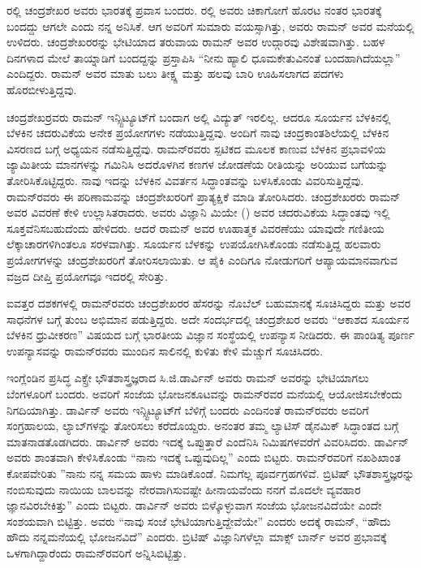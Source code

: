 ರಲ್ಲಿ ಚಂದ್ರಶೇಖರ ಅವರು ಭಾರತಕ್ಕೆ ಪ್ರವಾಸ ಬಂದರು. ರಲ್ಲಿ ಅವರು ಚಿಕಾಗೋಗೆ ಹೊರಟ ನಂತರ ಭಾರತಕ್ಕೆ ಬಂದದ್ದು ಆಗಲೇ ಎಂದು ನನ್ನ ಅನಿಸಿಕೆ. ಆಗ ಅವರಿಗೆ ಸುಮಾರು  ವಯಸ್ಸಾಗಿತ್ತು, ಅವರು ರಾಮನ್ ಅವರ ಮನೆಯಲ್ಲಿ ಉಳಿದರು. ಚಂದ್ರಶೇಖರರನ್ನು ಭೇಟಿಯಾದ ತರುವಾಯ ರಾಮನ್ ಅವರ ಉದ್ಗಾರವು ವಿಶೇಷವಾಗಿತ್ತು. ಬಹಳ ದಿನಗಳಾದ ಮೇಲೆ ತಾಯ್ನಾಡಿಗೆ ಬಂದದ್ದನ್ನು ಪ್ರಸ್ತಾಪಿಸಿ “ನೀನು ಹ್ಯಾಲಿ ಧೂಮಕೇತುವಿನಂತೆ ಬಂದಹಾಗಿದೆಯಲ್ಲಾ” ಎಂದಿದ್ದರು. ರಾಮನ್ ಅವರ ಮಾತು ಬಲು ತೀಕ್ಷ್ಣ ಮತ್ತು ಹಲವು ಬಾರಿ ಊಹಿಸಲಾಗದ ಪದಗಳು ಹೊರಬೀಳುತ್ತಿದ್ದವು.

\newpage

ಚಂದ್ರಶೇಖರ್‍ರವರು ರಾಮನ್ ಇನ್ಸ್ಟಿಟ್ಯೂಟ್‍ಗೆ ಬಂದಾಗ ಅಲ್ಲಿ ವಿದ್ಯುತ್ ಇರಲಿಲ್ಲ. ಆದರೂ ಸೂರ್ಯನ ಬೆಳಕಿನಲ್ಲಿ ಬೆಳಕಿನ ಚದರುವಿಕೆಯ ಅನೇಕ ಪ್ರಯೋಗಗಳು ನಡೆಯುತ್ತಿದ್ದವು. ಅಂದಿಗೆ ನಾವು ಚಂದ್ರಕಾಂತಶಿಲೆಯಲ್ಲಿ ಬೆಳಕಿನ ವಿಸರಣದ ಬಗ್ಗೆ ಅಧ್ಯಯನ ನಡೆಸುತ್ತಿದ್ದೆವು. ರಾಮನ್‍ರವರು ಸ್ಪಟಿಕದ ಮೂಲಕ ಕಾಣುವ ಬೆಳಕಿನ ಪ್ರಭಾವಳಿಯ ಜ್ಯಾಮಿತೀಯ ಮಾನಗಳನ್ನು ಗಮಿನಿಸಿ ಅದರೊಳಗಿನ ಕಣಗಳ ಜೋಡಣೆಯ ರೀತಿಯನ್ನು ಅರಿಯುವ ಬಗೆಯನ್ನು ತೋರಿಸಿಕೊಟ್ಟಿದ್ದರು. ನಾವು ಇದನ್ನು ಬೆಳಕಿನ ವಿವರ್ತನ ಸಿದ್ಧಾಂತವನ್ನು ಬಳಸಿಕೊಂಡು ವಿವರಿಸುತ್ತಿದ್ದೆವು. ರಾಮನ್‍ರವರು ಈ ಪರಿಣಾಮವನ್ನು ಚಂದ್ರಶೇಖರರಿಗೆ ಪ್ರಾತ್ಯಕ್ಷಿಕೆ ಮಾಡಿ ತೋರಿಸಿದರು. ಚಂದ್ರಶೇಖರರು ರಾಮನ್ ಅವರ ವಿವರಣೆ ಕೇಳಿ ಉಲ್ಲಾಸಿತರಾದರು. ಅವರು ವಿಜ್ಞಾನಿ ಮಿಯೇ () ಅವರ ಚದರುವಿಕೆಯ ಸಿದ್ಧಾಂತವು ಇಲ್ಲಿ ಸೂಕ್ತವೆನಿಸಬಹುದೆಂದು ಹೇಳಿದರು. ಆದರೆ ರಾಮನ್ ಅವರ ಊಹಾತ್ಮಕ ವಿವರಣೆಯು ಯಾವುದೇ ಗಣಿತೀಯ ಲೆಕ್ಕಾಚಾರಗಳಿಗಿಂತಲೂ ಸರಳವಾಗಿತ್ತು. ಸೂರ್ಯನ ಬೆಳಕನ್ನು ಉಪಯೋಗಿಸಿಕೊಂಡು ನಡೆಸುತ್ತಿದ್ದ ಹಲವಾರು ಪ್ರಯೋಗಗಳನ್ನು ಚಂದ್ರಶೇಖರರಿಗೆ ತೋರಿಸಲಾಯಿತು. ಆ ಪೈಕಿ ಎಂದಿಗೂ ನೋಡುಗರಿಗೆ ಆಪ್ಯಾಯಮಾನವಾಗುವ ವಜ್ರದ ದೀಪ್ತಿ ಪ್ರಯೋಗವೂ ಇದರಲ್ಲಿ ಸೇರಿತ್ತು.

ಐವತ್ತರ ದಶಕಗಳಲ್ಲಿ ರಾಮನ್‍ರವರು ಚಂದ್ರಶೇಖರರ ಹೆಸರನ್ನು ನೊಬೆಲ್ ಬಹುಮಾನಕ್ಕೆ ಸೂಚಿಸಿದ್ದರು ಮತ್ತು ಅವರ ಸಾಧನೆಗಳ ಬಗ್ಗೆ ತುಂಬ ಅಭಿಮಾನ ಪಡುತ್ತಿದ್ದರು. ಅದೇ ಸಂದರ್ಭದಲ್ಲಿ ಚಂದ್ರಶೇಖರ ಅವರು “ಆಕಾಶದ ಸೂರ್ಯನ ಬೆಳಕಿನ ಧ್ರುವೀಕರಣ” ವಿಷಯದ ಬಗ್ಗೆ ಭಾರತೀಯ ವಿಜ್ಞಾನ ಸಂಸ್ಥೆಯಲ್ಲಿ ಉಪನ್ಯಾಸ ನೀಡಿದರು. ಈ ಪಾಂಡಿತ್ಯ ಪೂರ್ಣ ಉಪನ್ಯಾಸವನ್ನು ರಾಮನ್‍ರವರು ಮುಂದಿನ ಸಾಲಿನಲ್ಲಿ ಕುಳಿತು ಕೇಳಿ ಮೆಚ್ಚುಗೆ ಸೂಚಿಸಿದರು.

\vskip 2pt



ಇಂಗ್ಲೆಂಡಿನ ಪ್ರಸಿದ್ಧ ಎಕ್ಸ್\enginline{-}ರೇ ಭೌತಶಾಸ್ತ್ರಜ್ಞರಾದ ಸಿ.ಜಿ.ಡಾರ್ವಿನ್ ಅವರು ರಾಮನ್ ಅವರನ್ನು ಭೇಟಿಯಾಗಲು ಬೆಂಗಳೂರಿಗೆ ಬಂದರು. ಅವರಿಗೆ ಸಂಜೆಯ ಭೋಜನಕೂಟವನ್ನು ರಾಮನ್‍ರವರ ಮನೆಯಲ್ಲಿ ಆಯೋಜಿಸಬೇಕೆಂದು ನಿಗದಿಯಾಗಿತ್ತು. ಡಾರ್ವಿನ್ ಅವರು ಇನ್ಸ್ಟಿಟ್ಯೂಟ್‍ಗೆ ಬೆಳಿಗ್ಗೆ ಬಂದರು ಎಂದಿನಂತೆ ರಾಮನ್‍ರವರು ಅವರಿಗೆ ಸಂಗ್ರಹಾಲಯ, ಲ್ಯಾಬ್‍ಗಳನ್ನು ತೋರಿಸಲು ಕರೆದೊಯ್ದರು. ಅನಂತರ ತಮ್ಮ ಲ್ಯಾಟಿಸ್ ಡೈನಮಿಕ್ ಸಿದ್ಧಾಂತದ ಬಗ್ಗೆ ಮಾತನಾಡತೊಡಗಿದರು. ಡಾರ್ವಿನ್ ಅವರು ಇದಕ್ಕೆ ಒಪ್ಪುತ್ತಾರೆ ಎಂದೆನಿಸಿ  ನಿಮಿಷಗಳವರೆಗೆ ವಿವರಿಸಿದರು. ಡಾರ್ವಿನ್ ಅವರು ಶಾಂತವಾಗಿ ಕೇಳಿಸಿಕೊಂಡು “ನಾನು ಇದಕ್ಕೆ ಒಪ್ಪುವುದಿಲ್ಲ” ಎಂದು ಬಿಟ್ಟರು. ರಾಮನ್‍ರವರಿಗೆ ನಖಶಿಖಾಂತ ಕೋಪವೇರಿತು ”ನಾನು ನನ್ನ ಸಮಯ ಹಾಳು ಮಾಡಿಕೊಂಡೆ. ನಿಮಗೆಲ್ಲ ಪೂರ್ವಗ್ರಹಗಳಿವೆ. ಬ್ರಿಟಿಷ್ ಭೌತಶಾಸ್ತ್ರಜ್ಞರನ್ನು ನಂಬಿಸುವುದು ನಾಯಿಯ ಬಾಲವನ್ನು ನೇರವಾಗಿಸುವಷ್ಟೇ ಹೀನಾಯವೆಂದು ನನಗೆ ಮೊದಲೇ ವ್ಯವಹಾರ ಜ್ಞಾನವಿರಬೇಕಿತ್ತು” ಎಂದು ಬಿಟ್ಟರು. ಡಾರ್ವಿನ್ ಅವರು ಬಿಳ್ಕೊಳ್ಳುವಾಗ ಸಂಜೆಯ ಭೋಜನವಿದೆಯೇ ಎಂದೇ ಸಂಶಯವಾಗಿ ಬಿಟ್ಟಿತ್ತು. ಅವರು “ನಾವು ಸಂಜೆ ಭೇಟಿಯಾಗುತ್ತಿದ್ದೇವೆಯೇ” ಎಂದರು ಅದಕ್ಕೆ ರಾಮನ್, “ಹೌದು ಹೌದು ನನ್ನ\break ಮನೆಯಲ್ಲಿ ಭೋಜನವಿದೆ” ಎಂದರು. ಬ್ರಿಟಿಷ್ ವಿಜ್ಞಾನಿಗಳೆಲ್ಲಾ ಮಾಕ್ಸ್ ಬಾರ್ನ್ ಅವರ ಪ್ರಭಾವಕ್ಕೆ ಒಳಗಾಗಿದ್ದಾರೆಂದು ರಾಮನ್‍ರವರಿಗೆ ಅನ್ನಿಸಿಬಿಟ್ಟಿತ್ತು.


